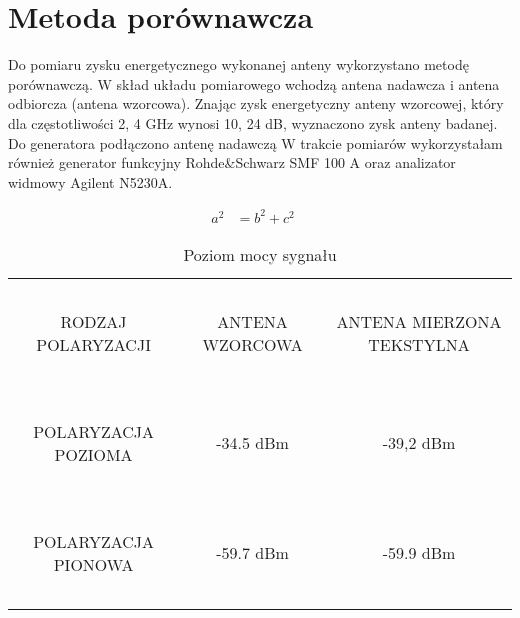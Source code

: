 \section{Metoda porównawcza}

Do pomiaru zysku energetycznego wykonanej anteny wykorzystano metodę porównawczą. W skład układu pomiarowego wchodzą antena nadawcza i antena odbiorcza (antena wzorcowa). Znając zysk energetyczny anteny wzorcowej, który dla częstotliwości 2, 4 GHz wynosi 10, 24 dB, wyznaczono zysk anteny badanej.
Do generatora podłączono antenę nadawczą
W trakcie pomiarów wykorzystałam również generator funkcyjny Rohde&Schwarz SMF 100 A oraz analizator widmowy Agilent N5230A.

\begin{align}
a^2&=b^2+c^2
\quad
\end{align}
 
\begin{table}[h!]
\begin{center}
    \begin{tabular}{|c|c|c|}
    \hline
    ~                     & ~               & ~                         \\
     RODZAJ POLARYZACJI    & ANTENA WZORCOWA & ANTENA MIERZONA TEKSTYLNA \\
    ~                     & ~               & ~                         \\ \hline
    ~                     & ~               & ~                         \\
     POLARYZACJA POZIOMA  & -34.5 dBm       & -39,2 dBm                 \\
    ~                     & ~               & ~                         \\ \hline
    ~                     & ~               & ~                         \\
     POLARYZACJA PIONOWA  & -59.7 dBm       & -59.9 dBm                 \\
    ~                     & ~               & ~                         \\ \hline
    \end{tabular}
    \caption{Poziom mocy sygnału}
\end{center}
\end{table}


